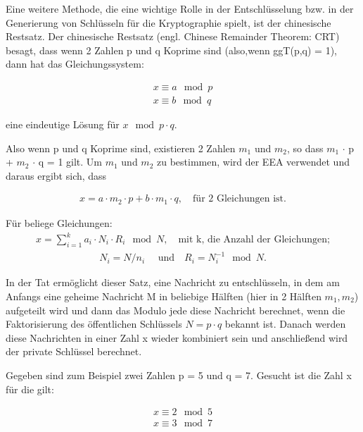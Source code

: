 Eine weitere Methode, die eine wichtige Rolle in der
Entschlüsselung bzw. in der Generierung von Schlüsseln für die
Kryptographie spielt, ist der chinesische Restsatz.
Der chinesische Restsatz (engl. Chinese Remainder Theorem: CRT) besagt, dass wenn 2 Zahlen p und q Koprime
sind (also,wenn ggT(p,q) = 1), dann hat das Gleichungssystem:

\begin{ceqn}
\begin{align*}
      x \equiv a \mod p \\
      x \equiv b \mod q 
\end{align*}
\end{ceqn}
eine eindeutige Lösung für \(x \mod p \cdot q \). 

Also wenn p und q Koprime sind, existieren 2 Zahlen $ m_1 $ und $ m_2 $, so dass $ m_1 $ $\cdot$ p + $ m_2 $ $\cdot $ q = 1 gilt. Um $ m_1 $ und  $ m_2 $ zu bestimmen, wird der EEA verwendet und daraus ergibt sich, dass

\begin{ceqn}
   \begin{align*}
       x = a \cdot m_2 \cdot p + b \cdot m_1 \cdot q, \quad \text{für 2 Gleichungen ist.}
   \end{align*}
\end{ceqn}
Für beliege Gleichungen:
\begin{align}
     x = \sum_{i=1}^{k} a_i \cdot N_i \cdot R_i \mod N, \quad \text{mit k, die Anzahl der Gleichungen;}
     \label{crt}
\end{align}
\begin{align*}
     N_i = N/n_i \quad \text{ und} \quad R_i = N_i^{-1} \mod N.
\end{align*}

In der Tat ermöglicht dieser Satz, eine Nachricht zu entschlüsseln, in dem am Anfangs eine geheime Nachricht M in
beliebige Hälften (hier in 2 Hälften $ m_1, m_2 $) aufgeteilt wird und dann das Modulo jede diese Nachricht berechnet, wenn die Faktorisierung des
öffentlichen Schlüssels $ N = p \cdot q $ bekannt ist. Danach
werden diese Nachrichten in einer Zahl x wieder kombiniert sein und anschließend wird der private Schlüssel berechnet.


Gegeben sind zum Beispiel zwei Zahlen p = 5 und q = 7. Gesucht ist die Zahl x für die gilt:
\begin{ceqn}
\begin{align*}
      x \equiv 2 \mod 5 \\
      x \equiv 3 \mod 7 
\end{align*}
\end{ceqn}

